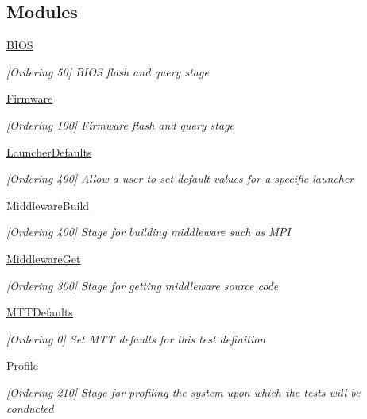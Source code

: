 \subsection*{Modules}
\begin{DoxyCompactItemize}
\item 
\hyperlink{group___b_i_o_s}{B\-I\-O\-S}
\begin{DoxyCompactList}\small\item\em \mbox{[}Ordering 50\mbox{]} B\-I\-O\-S flash and query stage \end{DoxyCompactList}\item 
\hyperlink{group___firmware}{Firmware}
\begin{DoxyCompactList}\small\item\em \mbox{[}Ordering 100\mbox{]} Firmware flash and query stage \end{DoxyCompactList}\item 
\hyperlink{group___launcher_defaults}{Launcher\-Defaults}
\begin{DoxyCompactList}\small\item\em \mbox{[}Ordering 490\mbox{]} Allow a user to set default values for a specific launcher \end{DoxyCompactList}\item 
\hyperlink{group___middleware_build}{Middleware\-Build}
\begin{DoxyCompactList}\small\item\em \mbox{[}Ordering 400\mbox{]} Stage for building middleware such as M\-P\-I \end{DoxyCompactList}\item 
\hyperlink{group___middleware_get}{Middleware\-Get}
\begin{DoxyCompactList}\small\item\em \mbox{[}Ordering 300\mbox{]} Stage for getting middleware source code \end{DoxyCompactList}\item 
\hyperlink{group___m_t_t_defaults}{M\-T\-T\-Defaults}
\begin{DoxyCompactList}\small\item\em \mbox{[}Ordering 0\mbox{]} Set M\-T\-T defaults for this test definition \end{DoxyCompactList}\item 
\hyperlink{group___profile}{Profile}
\begin{DoxyCompactList}\small\item\em \mbox{[}Ordering 210\mbox{]} Stage for profiling the system upon which the tests will be conducted \end{DoxyCompactList}\item 

\end{DoxyCompactItemize}
